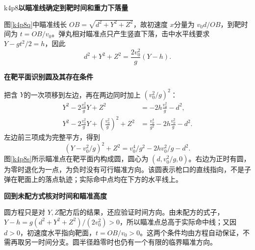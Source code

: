 \begin{drillsolution}{k4p8}\textbf{以瞄准线确定到靶时间和重力下落量}\par\nobreak
图\ref{k4p8q}中瞄准线长 $OB=\sqrt{d^2+Y^2+Z^2}$，故初速度 $x$分量为 $v_0d/OB$，到靶时间为 $t=OB/v_0$。弹丸相对瞄准点只产生竖直下落，击中水平线要求 $Y-gt^2/2=h$，因此
\[d^2+Y^2+Z^2=\frac{2v_0^2}{g}(Y-h).\]



\par\medskip{}\noindent\textbf{在靶平面识别圆及其存在条件}\par\nobreak
把含 $Y$的一次项移到左边，再在两边同时加上 $(v_0^2/g)^2$：
\begin{align*}
 Y^2-2\frac{v_0^2}{g}Y+Z^2
 &=-2h\frac{v_0^2}{g}-d^2,\\
 Y^2-2\frac{v_0^2}{g}Y+\left(\frac{v_0^2}{g}\right)^2+Z^2
 &=\frac{v_0^4}{g^2}-2h\frac{v_0^2}{g}-d^2.
\end{align*}
左边前三项成为完整平方，得到
\[\boxed{(Y-v_0^2/g)^2+Z^2=v_0^4/g^2-2hv_0^2/g-d^2}.\]
图\ref{k4p8s}所示瞄准点在靶平面内构成圆，圆心为 $(d,v_0^2/g,0)$。右边为正时有圆，为零时退化为一点，为负时没有可行瞄准方向。该圆表示枪口的直线指向，不是子弹在靶面上的落点轨迹；实际命中点均在下方的水平线上。



\par\medskip{}\noindent\textbf{回到未配方式核对时间和瞄准高度}\par\nobreak
圆方程只是对 $Y,Z$配方后的结果，还应验证时间方向。由未配方的式子，$Y-h=g(d^2+Y^2+Z^2)/(2v_0^2)>0$，所以瞄准点总高于实际命中线；又因 $d>0$，初速度水平指向靶面，$t=OB/v_0>0$。这两个条件均由方程自动保证，不需再取另一时间分支。圆半径趋零时也仍有一个有限的临界瞄准方向。\end{drillsolution}

